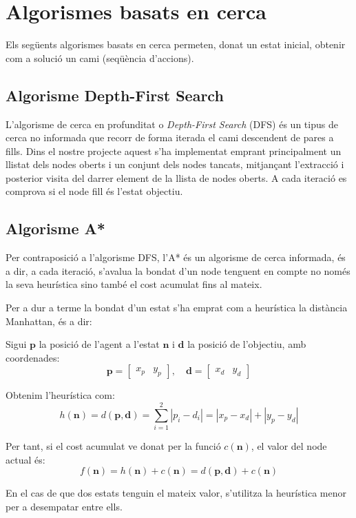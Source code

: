 \documentclass[12pt,a4paper]{report}
\begin{document}
\chapter{Algorismes basats en cerca}
\label{ch:searchAlgorithms}
Els següents algorismes basats en cerca permeten, donat un estat inicial, obtenir com a solució un cami (seqüència d'accions).
\section{Algorisme Depth-First Search}
L'algorisme de cerca en profunditat o \textit{Depth-First Search} (DFS) és un tipus de
cerca no informada que recorr de forma iterada el cami descendent de pares a fills.
Dins el nostre projecte aquest s'ha implementat emprant principalment un llistat dels nodes oberts 
i un conjunt dels nodes tancats, mitjançant l'extracció i posterior visita 
del darrer element de la llista de nodes oberts. 
A cada iteració es comprova si el node fill és l'estat objectiu.


\section{Algorisme A*}

Per contraposició a l'algorisme DFS, l'A* és un algorisme de cerca informada, és a dir, a cada iteració, s'avalua la bondat d'un node
tenguent en compte no només la seva heurística sino també el cost acumulat fins al mateix.

Per a dur a terme la bondat d'un estat s'ha emprat com a heurística la distància Manhattan,
és a dir:

Sigui $\mathbf{p}$ la posició de l'agent a l'estat $\mathbf{n}$ i $\mathbf{d}$ la posició de l'objectiu, amb coordenades:
{
\normalsize
\[
\mathbf{p} =
\begin{bmatrix}
x_p & y_p
\end{bmatrix}, \quad
\mathbf{d} =
\begin{bmatrix}
x_d & y_d
\end{bmatrix}
\]
}

Obtenim l'heurística com:
\[
  h(\mathbf{n})
  = d(\mathbf{p}, \mathbf{d}) 
  = \sum_{i=1}^{2} |p_i - d_i|
  = |x_p - x_d| + |y_p - y_d|
\]

Per tant, si el cost acumulat ve donat per la funció $c(\mathbf{n})$, el valor del node actual és:
\[
  f(\mathbf{n}) = h(\mathbf{n}) + c(\mathbf{n})
  = d(\mathbf{p}, \mathbf{d})  + c(\mathbf{n})
\]

En el cas de que dos estats tenguin el mateix valor, s'utilitza la heurística menor per a desempatar entre ells.
\end{document}
